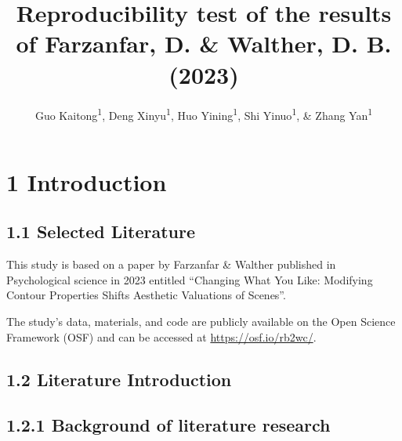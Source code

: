 \documentclass[
  man,floatsintext]{apa6}
\title{Reproducibility test of the results of Farzanfar, D. \& Walther, D. B. (2023)}
\author{Guo Kaitong\textsuperscript{1}, Deng Xinyu\textsuperscript{1}, Huo Yining\textsuperscript{1}, Shi Yinuo\textsuperscript{1}, \& Zhang Yan\textsuperscript{1}}
\date{}
\affiliation{\vspace{0.5cm}\textsuperscript{1} Group 7}
\begin{document}
\maketitle

\section{1 Introduction}\label{introduction}

\subsection{1.1 Selected Literature}\label{selected-literature}

This study is based on a paper by Farzanfar \& Walther published in Psychological science in 2023 entitled ``Changing What You Like: Modifying Contour Properties Shifts Aesthetic Valuations of Scenes''.

The study's data, materials, and code are publicly available on the Open Science Framework (OSF) and can be accessed at \url{https://osf.io/rb2wc/}.

\subsection{1.2 Literature Introduction}\label{literature-introduction}

\subsection{1.2.1 Background of literature research}\label{background-of-literature-research}
\end{document}
